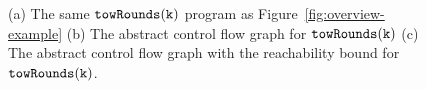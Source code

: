 \begin{figure}
    \vspace{-0.3cm}
    \caption{(a) The same $\mathtt{towRounds(k)}$ program as Figure~\ref{fig:overview-example}
    (b) The abstract control flow graph for $\mathtt{towRounds(k)}$  (c) The abstract control flow graph with the reachability bound for $\mathtt{towRounds(k)}$.}
    \vspace{-0.5cm}
    \label{fig:abscfg_tworound}
  \end{figure}
%
\subsection{}
\label{sec:alg_rbgen}
%




